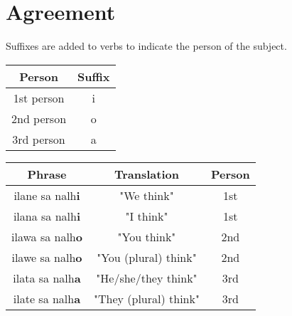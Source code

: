 \section{Agreement}

Suffixes are added to verbs to indicate the person of the subject.

\begin{table}[H]
    \centering
    \begin{tabular}{|c|c|}
        \hline
        \textbf{Person} & \textbf{Suffix} \\
        \hline
        1st person & i \\
        2nd person & o \\
        3rd person & a \\
        \hline
    \end{tabular}
    \label{tab:suffixes}
\end{table}


\begin{table}[H]
    \centering
    \begin{tabular}{|c|c|c|}
        \hline
        \textbf{Phrase} & \textbf{Translation} & \textbf{Person} \\
        \hline
        ilane sa nalh\textbf{i} & "We think" & 1st \\
        ilana sa nalh\textbf{i} & "I think" & 1st \\
        ilawa sa nalh\textbf{o} & "You think" & 2nd \\
        ilawe sa nalh\textbf{o} & "You (plural) think" & 2nd \\
        ilata sa nalh\textbf{a} & "He/she/they think" & 3rd \\
        ilate sa nalh\textbf{a} & "They (plural) think" & 3rd \\
        \hline
    \end{tabular}
    \label{tab:agreement}
\end{table}



